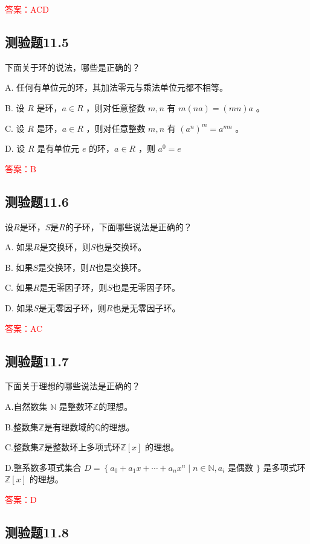 \documentclass[UTF8, heading=true]{ctexart}
\begin{document}
\textcolor{red}{答案：ACD}

\subsection{测验题11.5}

下面关于环的说法，哪些是正确的？

A. 任何有单位元的环，其加法零元与乘法单位元都不相等。

B. 设 $R$ 是环，$a \in R$ ，则对任意整数 $m, n$ 有 $m(n a)=(m n) a$ 。

C. 设 $R$ 是环，$a \in R$ ，则对任意整数 $m, n$ 有 $\left(a^n\right)^m=a^{m n}$ 。

D. 设 $R$ 是有单位元 $e$ 的环，$a \in R$ ，则 $a^0=e$

\textcolor{red}{答案：B}

\subsection{测验题11.6}

设$R$是环，$S$是$R$的子环，下面哪些说法是正确的？

A. 如果$R$是交换环，则$S$也是交换环。

B. 如果$S$是交换环，则$R$也是交换环。

C. 如果$R$是无零因子环，则$S$也是无零因子环。

D. 如果$S$是无零因子环，则$R$也是无零因子环。

\textcolor{red}{答案：AC}

\subsection{测验题11.7}

下面关于理想的哪些说法是正确的？

A.自然数集 $\mathbb{N}$ 是整数环$\mathbb{Z}$的理想。

B.整数集$\mathbb{Z}$是有理数域的$\mathbb{Q}$的理想。

C.整数集$\mathbb{Z}$是整数环上多项式环$\mathbb{Z}[x]$ 的理想。

D.整系数多项式集合 $D=\left\{a_0+a_1 x+\cdots+a_n x^n \mid n \in \mathbb{N}, a_i\right.$ 是偶数 $\}$ 是多项式环 $\mathbb{Z}[x]$ 的理想。


\textcolor{red}{答案：D}


\subsection{测验题11.8}
\end{document}
